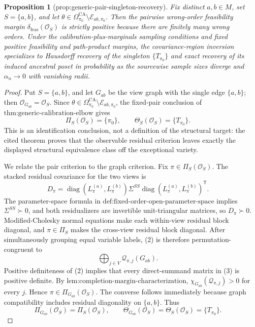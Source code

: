 \documentclass{article}
\newtheorem{proposition}{Proposition}
\begin{document}
\begin{proposition}[prop:generic-pair-singleton-recovery]\label{prop:generic-pair-singleton-recovery}
Fix distinct \(a,b\in M\), set \(S=\{a,b\}\), and let \(\theta\in\Omega_{\pi_0}^{\mathrm{CA}}\setminus\mathcal E_{ab,\pi_0}\). Then the pairwise wrong-order feasibility margin \(\delta_{\mathrm{feas}}(\mathcal O_S)\) is strictly positive because there are finitely many wrong orders. Under the calibration-plus-marginals sampling conditions and fixed positive feasibility and path-product margins, the covariance-region inversion specializes to Hausdorff recovery of the singleton \(\{T_{\pi_0}\}\) and exact recovery of its induced ancestral poset in probability as the sourcewise sample sizes diverge and \(\alpha_n\to0\) with vanishing radii.
\end{proposition}
\begin{proof}
Put \(S=\{a,b\}\), and let \(G_{ab}\) be the view graph with the single edge \(\{a,b\}\); then \(\mathcal O_{G_{ab}}=\mathcal O_S\).  Since \(\theta\in\Omega_{\pi_0}^{\mathrm{CA}}\setminus\mathcal E_{ab,\pi_0}\), the fixed-pair conclusion of \(\text{thm:generic-calibration-elbow}\) gives
\[
\Pi_S(\mathcal O_S)=\{\pi_0\},
\qquad
\Theta_S(\mathcal O_S)=\{T_{\pi_0}\}.
\tag{1}
\]
This is an identification conclusion, not a definition of the structural target: the cited theorem proves that the observable residual criterion leaves exactly the displayed structural equivalence class off the exceptional variety.

We relate the pair criterion to the graph criterion.  Fix \(\pi\in\Pi_S(\mathcal O_S)\).  The stacked residual covariance for the two views is
\[
D_\pi=
\operatorname{diag}(L_\pi^{(a)},L_\pi^{(b)})
\Sigma^{SS}
\operatorname{diag}(L_\pi^{(a)},L_\pi^{(b)})^{\mathsf T}.
\tag{2}
\]
The parameter-space formula in \(\text{def:fixed-order-open-parameter-space}\) implies \(\Sigma^{SS}\succ0\), and both residualizers are invertible unit-triangular matrices, so \(D_\pi\succ0\).  Modified-Cholesky normal equations make each within-view residual block diagonal, and \(\pi\in\Pi_S\) makes the cross-view residual block diagonal.  After simultaneously grouping equal variable labels, (2) is therefore permutation-congruent to
\[
\bigoplus_{j\in V}\mathcal Q_{\pi,j}(G_{ab}).
\tag{3}
\]
Positive definiteness of (2) implies that every direct-summand matrix in (3) is positive definite.  By \(\text{lem:completion-margin-characterization}\), \(\chi_{G_{ab}}(\mathcal Q_{\pi,j})>0\) for every \(j\).  Hence \(\pi\in\Pi_{G_{ab}}(\mathcal O_S)\).  The converse follows immediately because graph compatibility includes residual diagonality on \(\{a,b\}\).  Thus
\[
\Pi_{G_{ab}}(\mathcal O_S)=\Pi_S(\mathcal O_S),
\qquad
\Theta_{G_{ab}}(\mathcal O_S)=\Theta_S(\mathcal O_S)=\{T_{\pi_0}\}.
\tag{4}
\]


\end{proof}
\end{document}
